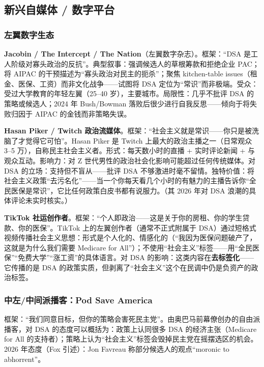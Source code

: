 \documentclass[12pt,a4paper]{ctexart}
\begin{document}
\subsection{新兴自媒体 / 数字平台}

\subsubsection{左翼数字生态}

\textbf{Jacobin / The Intercept / The Nation}（左翼数字杂志）。框架：``DSA 是工人阶级对寡头政治的反抗''。典型叙事：强调候选人的草根筹款和拒绝企业 PAC；将 AIPAC 的干预描述为``寡头政治对民主的扼杀''；聚焦 kitchen-table issues（租金、医保、工资）而非文化战争——试图将 DSA 定位为``常识''而非极端。受众：受过大学教育的年轻左翼（25--40 岁），主要城市。局限性：几乎不批评 DSA 的策略或候选人；2024 年 Bush/Bowman 落败后很少进行自我反思——倾向于将失败归因于 AIPAC 的金钱而非策略失误。

\textbf{Hasan Piker / Twitch 政治流媒体}。框架：``社会主义就是常识——你只是被洗脑了才觉得它可怕''。Hasan Piker 是 Twitch 上最大的政治主播之一（日常观众 3--5 万），自称民主社会主义者。形式：每天数小时的直播 + 实时评论新闻 + 与观众互动。影响力：对 Z 世代男性的政治社会化影响可能超过任何传统媒体。对 DSA 的立场：支持但不盲从——批评 DSA 不够激进时毫不留情。独特价值：将社会主义政策``去污名化''——当一个你每天看几个小时的有魅力的主播告诉你``全民医保是常识''，它比任何政策白皮书都有说服力。（其 2026 年对 DSA 浪潮的具体评论未实时核实。）

\textbf{TikTok 社运创作者}。框架：``个人即政治——这是关于你的房租、你的学生贷款、你的医保''。TikTok 上的左翼创作者（通常不正式附属于 DSA）通过短格式视频传播社会主义思想：形式是个人化的、情感化的（``我因为医保问题破产了，这就是为什么我们需要 Medicare for All''）；不使用``社会主义''标签——用``全民医保''``免费大学''``涨工资''的具体语言。对 DSA 的影响：这类内容在\textbf{去标签化}——它传播的是 DSA 的政策实质，但剥离了``社会主义''这个在民调中仍是负资产的政治标签。

\subsubsection{中左/中间派播客：Pod Save America}

框架：``我们同意目标，但你的策略会害死民主党''。由奥巴马前幕僚创办的自由派播客，对 DSA 的态度可以概括为：政策上认同很多 DSA 的经济主张（Medicare for All 的支持者）；策略上认为``社会主义''标签会毁掉民主党在摇摆选区的机会。2026 年态度（Fox 引述）：Jon Favreau 称部分候选人的观点``moronic to abhorrent''。
\end{document}
